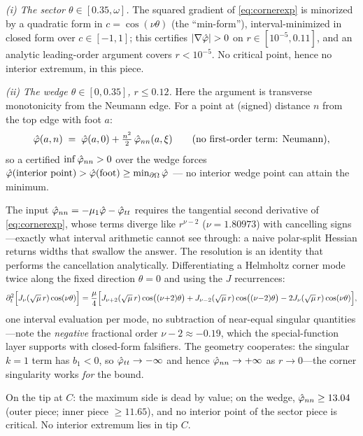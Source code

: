 \documentclass[11pt]{article}
\begin{document}
\emph{(i) The sector $\theta\in[0.35,\omega]$.} The squared gradient of
\eqref{eq:cornerexp} is minorized by a quadratic form in
$c=\cos(\nu\theta)$ (the ``min-form''), interval-minimized in closed
form over $c\in[-1,1]$; this certifies $|\nabla\phih|>0$ on
$r\in[10^{-5},0.11]$, and an analytic leading-order argument covers
$r<10^{-5}$. No critical point, hence no interior extremum, in this
piece.

\emph{(ii) The wedge $\theta\in[0,0.35]$, $r\le0.12$.} Here the
argument is transverse monotonicity from the Neumann edge. For a point
at (signed) distance $n$ from the top edge with foot $a$:
\[
\hat\varphi(a,n)\;=\;\hat\varphi(a,0)+\tfrac{n^2}{2}\,\hat\varphi_{nn}(a,\xi)
\qquad\text{(no first-order term: Neumann)},
\]
so a certified $\inf\hat\varphi_{nn}>0$ over the wedge forces
$\hat\varphi(\text{interior point})>\hat\varphi(\text{foot})\ge\min_{\partial\Omega}\hat\varphi$
--- no interior wedge point can attain the minimum.

The input $\hat\varphi_{nn}=-\mu_1\hat\varphi-\hat\varphi_{tt}$ requires the tangential
second derivative of \eqref{eq:cornerexp}, whose terms diverge like
$r^{\nu-2}$ ($\nu=1.80973$) with cancelling signs---exactly what
interval arithmetic cannot see through: a naive polar-split Hessian
returns widths that swallow the answer. The resolution is an identity
that performs the cancellation analytically. Differentiating a
Helmholtz corner mode twice along the fixed direction $\theta=0$ and
using the $J$ recurrences:
\begin{equation}\label{eq:ladder}
\partial_t^2\Bigl[J_{\nu}(\sqrt{\mu}\,r)\cos(\nu\theta)\Bigr]
=\frac{\mu}{4}\Bigl[
J_{\nu+2}(\sqrt{\mu}\,r)\cos\bigl((\nu{+}2)\theta\bigr)
+J_{\nu-2}(\sqrt{\mu}\,r)\cos\bigl((\nu{-}2)\theta\bigr)
-2J_{\nu}(\sqrt{\mu}\,r)\cos(\nu\theta)\Bigr],
\end{equation}
one interval evaluation per mode, no subtraction of near-equal singular
quantities---note the \emph{negative} fractional order $\nu-2\approx
-0.19$, which the special-function layer supports with closed-form
falsifiers. The geometry cooperates: the singular $k{=}1$ term has
$b_1<0$, so $\hat\varphi_{tt}\to-\infty$ and hence $\hat\varphi_{nn}\to+\infty$ as
$r\to0$---the corner singularity works \emph{for} the bound.

\begin{lemma}[tip $C$]\label{lem:tipC}
On the tip at $C$: the maximum side is dead by value; on the wedge,
$\hat\varphi_{nn}\ge13.04$ (outer piece; inner piece $\ge11.65$), and no
interior point of the sector piece is critical. No interior extremum
lies in tip $C$.
\end{lemma}
\end{document}
